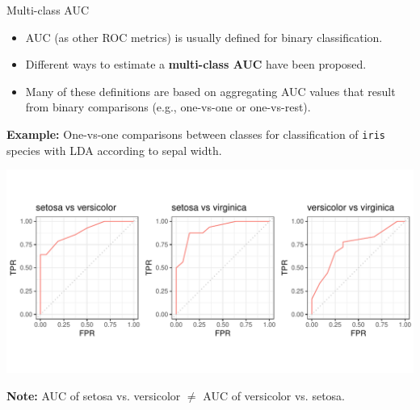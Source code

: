 
\begin{vbframe}{Multi-class AUC}


\begin{itemize}
  \small
  \item AUC (as other ROC metrics) is usually defined for binary classification.
  \item Different ways to estimate a \textbf{multi-class AUC} have been proposed.
  \item Many of these definitions are based on aggregating AUC values
  that result from binary comparisons (e.g., one-vs-one or one-vs-rest).
\end{itemize}


\textbf{Example:} One-vs-one comparisons between classes for classification of \texttt{iris} species with LDA according to sepal width.

\centering
\includegraphics[trim = 0 40 -20 40, clip, width=\textwidth]{figure/eval_auc_extensions}

\textbf{Note:} AUC of setosa vs. versicolor $\neq$ AUC of versicolor vs. setosa.



\end{vbframe}
